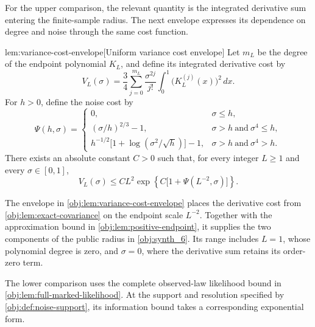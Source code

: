 For the upper comparison, the relevant quantity is the integrated derivative sum entering the finite-sample radius. The next envelope expresses its dependence on degree and noise through the same cost function.

\begin{lemmav}{lem:variance-cost-envelope}[Uniform variance cost envelope]
Let \(m_L\) be the degree of the endpoint polynomial \(K_L\), and define its integrated derivative cost by
\[
V_L(\sigma)
=\frac34\sum_{j=0}^{m_L}\frac{\sigma^{2j}}{j!}
\int_0^1\bigl(K_L^{(j)}(x)\bigr)^2\,dx.
\]
For \(h>0\), define the noise cost by
\[
\Psi(h,\sigma)=
\begin{cases}
0, & \sigma\le h,\\
(\sigma/h)^{2/3}-1, & \sigma>h\ \text{and}\ \sigma^4\le h,\\
h^{-1/2}\bigl[1+\log(\sigma^2/\sqrt h)\bigr]-1,
& \sigma>h\ \text{and}\ \sigma^4>h.
\end{cases}
\]
There exists an absolute constant \(C>0\) such that, for every integer \(L\ge1\) and every \(\sigma\in[0,1]\),
\[
V_L(\sigma)\le C L^2
\exp\!\left\{C\bigl[1+\Psi(L^{-2},\sigma)\bigr]\right\}.
\]
\end{lemmav}

The envelope in \cref{obj:lem:variance-cost-envelope} places the derivative cost from \cref{obj:lem:exact-covariance} on the endpoint scale \(L^{-2}\). Together with the approximation bound in \cref{obj:lem:positive-endpoint}, it supplies the two components of the public radius in \cref{obj:synth_6}. Its range includes \(L=1\), whose polynomial degree is zero, and \(\sigma=0\), where the derivative sum retains its order-zero term.

The lower comparison uses the complete observed-law likelihood bound in \cref{obj:lem:full-marked-likelihood}. At the support and resolution specified by \cref{obj:def:noise-support}, its information bound takes a corresponding exponential form.

